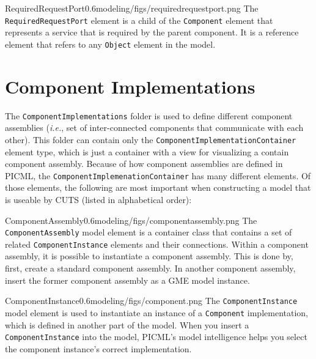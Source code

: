 \begin{modelelement}{RequiredRequestPort}{0.6}{modeling/figs/requiredrequestport.png}
The \texttt{RequiredRequestPort} element is a child of the \texttt{Component}
element that represents a service that is required by the parent component.
It is a reference element that refers to any \texttt{Object} element in
the model.
\end{modelelement}

\section{Component Implementations}

The \texttt{ComponentImplementations} folder is used to define 
different component assemblies (\textit{i.e.}, set of inter-connected
components that communicate with each other).
This folder can contain only the \texttt{ComponentImplementationContainer} 
element type, which is just a container with a view for visualizing
a contain component assembly. Because of how component assemblies are
defined in PICML, the \texttt{ComponentImplemenationContainer} has
many different elements. Of those elements, the following are most 
important when constructing a model that is useable by CUTS 
(listed in alphabetical order):

\begin{modelelement}{ComponentAssembly}{0.6}{modeling/figs/componentassembly.png}
The \texttt{ComponentAssembly} model element is a container class that
contains a set of related \texttt{ComponentInstance} elements and their
connections. Within a component assembly, it is possible to instantiate
a component assembly. This is done by, first, create a standard component
assembly. In another component assembly, insert the former component 
assembly as a GME model instance.
\end{modelelement}

\begin{modelelement}{ComponentInstance}{0.6}{modeling/figs/component.png}
The \texttt{ComponentInstance} model element is used to instantiate an
instance of a \texttt{Component} implementation, which is defined in another
part of the model. When you insert a \texttt{ComponentInstance} into the
model, PICML's model intelligence helps you select the component instance's
correct implementation.
\end{modelelement}

